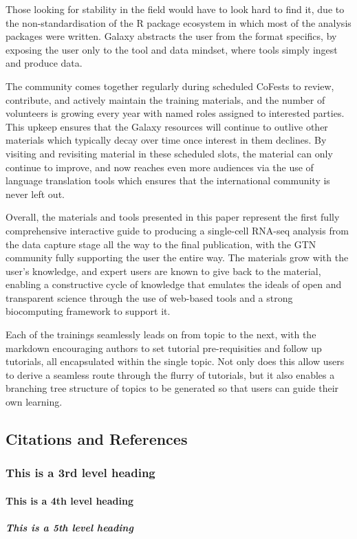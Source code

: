 \documentclass[a4paper,num-refs]{oup-contemporary}
\begin{document}
Those looking for stability in the field would have to look hard to find it, due to the non-standardisation of the R package ecosystem in which most of the analysis packages were written. Galaxy abstracts the user from the format specifics, by exposing the user only to the tool and data mindset, where tools simply ingest and produce data.

The community comes together regularly during scheduled CoFests to review, contribute, and actively maintain the training materials, and the number of volunteers is growing every year with named roles assigned to interested parties. This upkeep ensures that the Galaxy resources will continue to outlive other materials which typically decay over time once interest in them declines. By visiting and revisiting material in these scheduled slots, the material can only continue to improve, and now reaches even more audiences via the use of language translation tools which ensures that the international community is never left out.

Overall, the materials and tools presented in this paper represent the first fully comprehensive interactive guide to producing a single-cell RNA-seq analysis from the data capture stage all the way to the final publication, with the GTN community fully supporting the user the entire way. The materials grow with the user's knowledge, and expert users are known to give back to the material, enabling a constructive cycle of knowledge that emulates the ideals of open and transparent science through the use of web-based tools and a strong biocomputing framework to support it.

Each of the trainings seamlessly leads on from topic to the next, with the markdown encouraging authors to set tutorial pre-requisities and follow up tutorials, all encapsulated within the single topic. Not only does this allow users to derive a seamless route through the flurry of tutorials, but it also enables a branching tree structure of topics to be generated so that users can guide their own learning.

\subsection{Citations and References}
\subsubsection{This is a 3rd level heading}
\paragraph{This is a 4th level heading}
\subparagraph{This is a 5th level heading}
\end{document}
